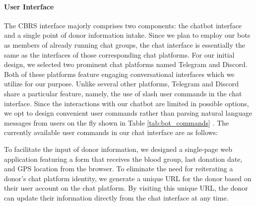 \documentclass[11pt]{article}
\begin{document}
 \paragraph{User Interface}
The CBRS interface majorly comprises two components: the chatbot interface and a single point of donor information intake. Since we plan to employ our bots as members of already running chat groups, the chat interface is essentially the same as the interfaces of those corresponding chat platforms. For our initial design, we selected two prominent chat platforms named Telegram and Discord. Both of these platforms feature engaging conversational interfaces which we utilize for our purpose. Unlike several other platforms, Telegram and Discord share a particular feature, namely, the use of slash user commands in the chat interface. Since the interactions with our chatbot are limited in possible options, we opt to design convenient user commands rather than parsing natural language messages from users on the fly shown in Table \ref{tab:bot_commands} . The currently available user commands in our chat interface are as follows:

\begin{table}[h]
    \centering
    \caption{Bot Commands and their Purposes}
    \label{tab:bot_commands}
\end{table}
To facilitate the input of donor information, we designed a single-page web application featuring a form that receives the blood group, last donation date, and GPS location from the browser. To eliminate the need for reiterating a donor’s chat platform identity, we generate a unique URL for the donor based on their user account on the chat platform. By visiting this unique URL, the donor can update their information directly from the chat interface at any time.
\end{document}

